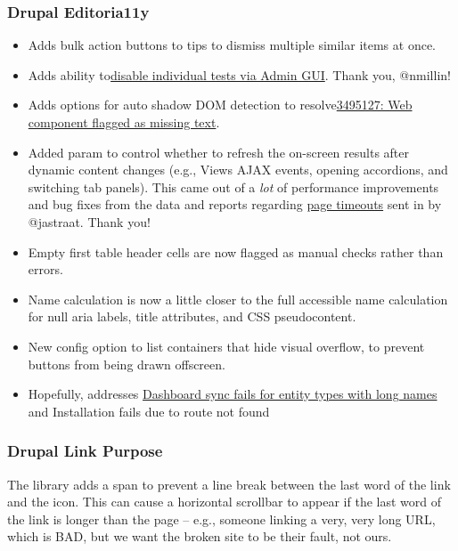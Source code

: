     \subsubsection{Drupal Editoria11y}
    \begin{itemize}
        \item Adds bulk action buttons to tips to dismiss multiple similar items at once.
        \item Adds ability to\href{https://www.drupal.org/project/editoria11y/issues/3357207}{disable individual tests via Admin GUI}.
        Thank you, @nmillin!
        \item Adds options for auto shadow DOM detection to resolve\href{https://www.drupal.org/project/editoria11y/issues/3495127}{3495127: Web component flagged as missing text}.
        \item Added param to control whether to refresh the on-screen results
        after dynamic content changes (e.g., Views AJAX events, opening accordions, and switching tab panels).
        This came out of a \textit{lot} of performance improvements and bug fixes from the data and reports regarding \href{https://www.drupal.org/project/editoria11y/issues/3501807}{page timeouts} sent in by @jastraat.
        Thank you!
        \item Empty first table header cells are now flagged as manual checks rather than errors.
        \item Name calculation is now a little closer to the full accessible name calculation for null aria labels, title attributes, and CSS pseudocontent.
        \item New config option to list containers that hide visual overflow, to prevent buttons from being drawn offscreen.
        \item Hopefully, addresses \href{https://www.drupal.org/project/editoria11y/issues/3515376}{Dashboard sync fails for entity types with long names} and Installation fails due to route not found
    \end{itemize}

    \subsubsection{Drupal Link Purpose}
    The library adds a span to prevent a line break between the last word of the link and the icon.
    This can cause a horizontal scrollbar to appear if the last word of the link is longer than the page -- e.g., someone linking a very, very long URL, which is BAD, but we want the broken site to be their fault, not ours.


